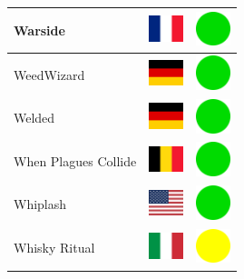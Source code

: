 \documentclass[12pt, a4paper, twoside]{report}
\begin{document}
\begin{center}
\begin{longtable}{|p{5cm}|p{2cm}|p{2cm}|}
 Warside                                                    & \includegraphics[width=1cm]{../4x3/fr} &   \includegraphics[width=1cm]{../likes/y} \\ \hline
 WeedWizard                                                 & \includegraphics[width=1cm]{../4x3/de} &   \includegraphics[width=1cm]{../likes/y} \\ \hline
 Welded                                                     & \includegraphics[width=1cm]{../4x3/de} &   \includegraphics[width=1cm]{../likes/y} \\ \hline
 When Plagues Collide                                       & \includegraphics[width=1cm]{../4x3/be} &   \includegraphics[width=1cm]{../likes/y} \\ \hline
 Whiplash                                                   & \includegraphics[width=1cm]{../4x3/us} &   \includegraphics[width=1cm]{../likes/y} \\ \hline
 Whisky Ritual                                              & \includegraphics[width=1cm]{../4x3/it} &   \includegraphics[width=1cm]{../likes/m} \\ \hline

\end{longtable}
\end{center}
\end{document}

